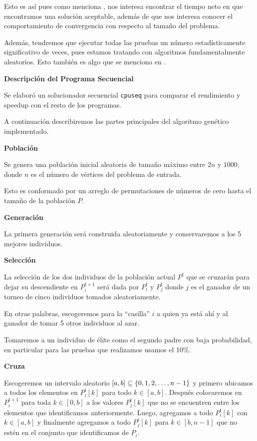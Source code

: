 \documentclass[main.tex]{subfiles}
\begin{document}
Esto es así pues como menciona \parencite{alba_ch2}, nos interesa encontrar
el tiempo neto en que encontramos una solución aceptable, además de que nos
interesa conocer el comportamiento de convergencia con respecto al tamaño del
problema.

Además, tendremos que ejecutar todas las pruebas un número estadísticamente
significativo de veces, pues estamos tratando con algoritmos fundamentalmente
aleatorios. Esto también es algo que se menciona en \parencite{alba_ch2}.

\begin{cajaEnunciado}
    \textbf{Descripción del Programa Secuencial}
\end{cajaEnunciado}

Se elaboró un solucionador secuencial \texttt{cpuseq} para comparar el
rendimiento y speedup con el resto de los programas.

A continuación describiremos las partes principales del algoritmo genético
implementado.

\textbf{Población}

Se genera una población inicial aleatoria de tamaño máximo entre $2n$ y $1000$,
donde $n$ es el número de vértices del problema de entrada.

Esto es conformado por un arreglo de permutaciones de números de cero hasta el
tamaño de la población $P$.

\textbf{Generación}

La primera generación será construida aleatoriamente y conservaremos a los 5
mejores individuos.

\textbf{Selección}

La selección de los dos individuos de la población actual $P^t$ que se cruzarán
para dejar su descendiente en $P_i^{t+1}$ será dada por $P_i^t$ y $P_j^t$ donde
$j$ es el ganador de un torneo de cinco individuos tomados aleatoriamente.

En otras palabras, escogeremos para la ``casilla'' $i$ a quien ya está ahí y al
ganador de tomar 5 otros individuos al azar.

Tomaremos a un individuo de élite como el segundo padre con baja probabilidad,
en particular para las pruebas que realizamos usamos el 10\%.

\textbf{Cruza}

Escogeremos un intervalo aleatorio $[a,b] \subseteq \left\{ 0,1,2,\dots,n-1 \right\}$ y
primero ubicamos a todos los elementos en $P_i^t[k]$ para todo $k\in [a,b]$.
Después colocaremos en $P_i^{t+1}$ para toda $k\in [0,b]$ a los valores
$P_j^t[k]$ que no se encuentren entre los elementos que identificamos
anteriormente. Luego, agregamos a todo $P_i^t[k]$ con $k\in[a,b]$ y finalmente
agregamos a todo $P_j^t[k]$ para $k\in[b,n-1]$ que no estén en el conjunto que
identificamos de $P_i$.
\end{document}
